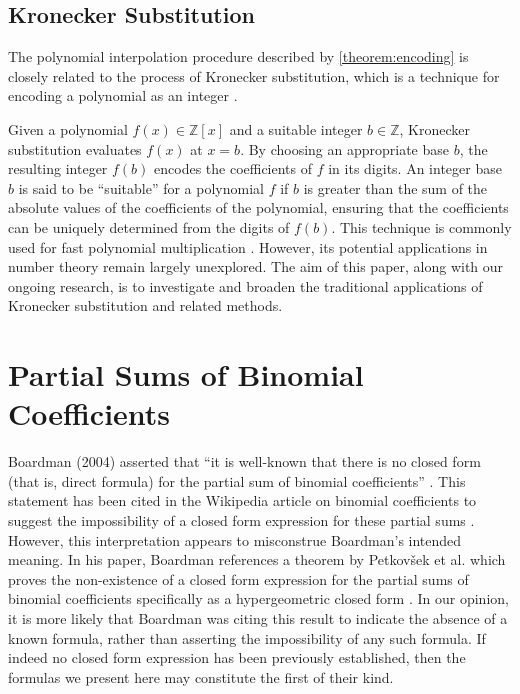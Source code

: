 \documentclass[10pt]{article}
\theoremstyle{plain}
\begin{document}
\subsection{Kronecker Substitution} \label{subsection:kronecker}
The polynomial interpolation procedure described by \cref{theorem:encoding} is closely related to the process of Kronecker substitution, which is a technique for encoding a polynomial as an integer \cite{gathen2013modern}.

Given a polynomial $f(x) \in \mathbb{Z}[x]$ and a suitable integer $b \in \mathbb{Z}$, Kronecker substitution evaluates $f(x)$ at $x = b$. By choosing an appropriate base $b$, the resulting integer $f(b)$ encodes the coefficients of $f$ in its digits. An integer base $b$ is said to be ``suitable'' for a polynomial $f$ if $b$ is greater than the sum of the absolute values of the coefficients of the polynomial, ensuring that the coefficients can be uniquely determined from the digits of $f(b)$. This technique is commonly used for fast polynomial multiplication \cite{harvey2009kronecker, harvey2019faster, albrecht2018implementing, bos2020postquantum, greuet2022modular}. However, its potential applications in number theory remain largely unexplored. The aim of this paper, along with our ongoing research, is to investigate and broaden the traditional applications of Kronecker substitution and related methods.

\section{Partial Sums of Binomial Coefficients} \label{section:partialsums}
Boardman (2004) asserted that ``it is well-known that there is no closed form (that is, direct formula) for the partial sum of binomial coefficients'' \cite{boardman2004eggdropnumbers}. This statement has been cited in the Wikipedia article on binomial coefficients to suggest the impossibility of a closed form expression for these partial sums \cite{wikipedia2024binomialcoefficient}. However, this interpretation appears to misconstrue Boardman's intended meaning. In his paper, Boardman references a theorem by Petkovšek et al. which proves the non-existence of a closed form expression for the partial sums of binomial coefficients specifically as a hypergeometric closed form \cite{petkovsek1996ab}. In our opinion, it is more likely that Boardman was citing this result to indicate the absence of a known formula, rather than asserting the impossibility of any such formula. If indeed no closed form expression has been previously established, then the formulas we present here may constitute the first of their kind.
\end{document}
